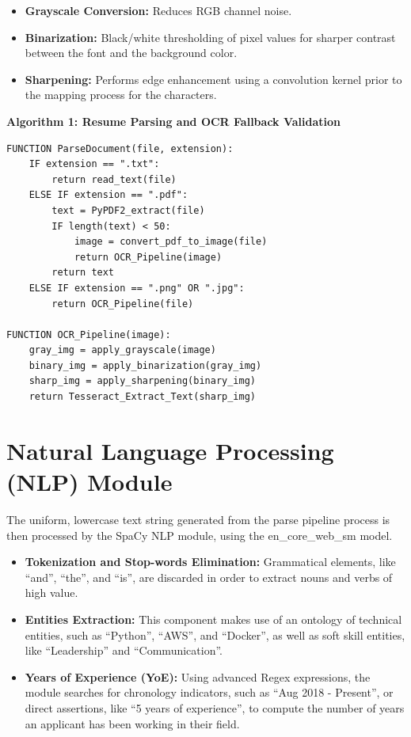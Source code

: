 \begin{itemize}
    \item \textbf{Grayscale Conversion:} Reduces RGB channel noise.
    \item \textbf{Binarization:} Black/white thresholding of pixel values for sharper contrast between the font and the background color.
    \item \textbf{Sharpening:} Performs edge enhancement using a convolution kernel prior to the mapping process for the characters. 
\end{itemize}

\textbf{Algorithm 1: Resume Parsing and OCR Fallback Validation}

\begin{verbatim}
FUNCTION ParseDocument(file, extension):
    IF extension == ".txt":
        return read_text(file)
    ELSE IF extension == ".pdf":
        text = PyPDF2_extract(file)
        IF length(text) < 50:
            image = convert_pdf_to_image(file)
            return OCR_Pipeline(image)
        return text
    ELSE IF extension == ".png" OR ".jpg":
        return OCR_Pipeline(file)

FUNCTION OCR_Pipeline(image):
    gray_img = apply_grayscale(image)
    binary_img = apply_binarization(gray_img)
    sharp_img = apply_sharpening(binary_img)
    return Tesseract_Extract_Text(sharp_img)
\end{verbatim}

\section{Natural Language Processing (NLP) Module}
The uniform, lowercase text string generated from the parse pipeline process is then processed by the SpaCy NLP module, using the en\_core\_web\_sm model.

\begin{itemize}
    \item \textbf{Tokenization and Stop-words Elimination:} Grammatical elements, like ``and'', ``the'', and ``is'', are discarded in order to extract nouns and verbs of high value.
    \item \textbf{Entities Extraction:} This component makes use of an ontology of technical entities, such as ``Python'', ``AWS'', and ``Docker'', as well as soft skill entities, like ``Leadership'' and ``Communication''.
    \item \textbf{Years of Experience (YoE):} Using advanced Regex expressions, the module searches for chronology indicators, such as ``Aug 2018 - Present'', or direct assertions, like ``5 years of experience'', to compute the number of years an applicant has been working in their field.
\end{itemize}

